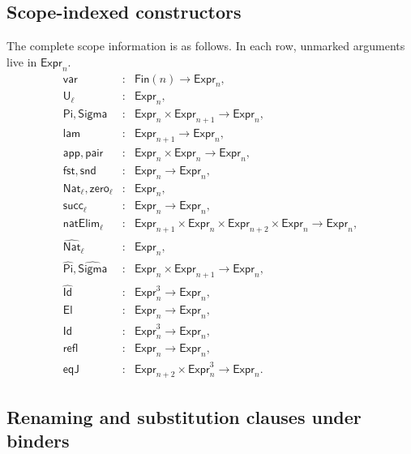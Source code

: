 \documentclass[10pt,reqno]{amsart}
\newcommand{\Fin}{\mathsf{Fin}}
\newcommand{\Expr}{\mathsf{Expr}}
\newcommand{\Var}{\mathsf{var}}
\newcommand{\Sort}{\mathsf{U}}
\newcommand{\PiTy}{\mathsf{Pi}}
\newcommand{\SigmaTy}{\mathsf{Sigma}}
\newcommand{\Lam}{\mathsf{lam}}
\newcommand{\App}{\mathsf{app}}
\newcommand{\Pair}{\mathsf{pair}}
\newcommand{\Fst}{\mathsf{fst}}
\newcommand{\Snd}{\mathsf{snd}}
\newcommand{\NatTy}{\mathsf{Nat}}
\newcommand{\Zero}{\mathsf{zero}}
\newcommand{\Succ}{\mathsf{succ}}
\newcommand{\NatElim}{\mathsf{natElim}}
\newcommand{\CodeNat}{\widehat{\mathsf{Nat}}}
\newcommand{\CodePi}{\widehat{\mathsf{Pi}}}
\newcommand{\CodeSigma}{\widehat{\mathsf{Sigma}}}
\newcommand{\CodeId}{\widehat{\mathsf{Id}}}
\newcommand{\El}{\mathsf{El}}
\newcommand{\IdTy}{\mathsf{Id}}
\newcommand{\Refl}{\mathsf{refl}}
\newcommand{\EqJ}{\mathsf{eqJ}}
\begin{document}
\subsection{Scope-indexed constructors}

The complete scope information is as follows.  In each row, unmarked
arguments live in \(\Expr_n\).
\[
\begin{array}{rcl}
\Var &:& \Fin(n)\to\Expr_n,\\
\Sort_\ell&:&\Expr_n,\\
\PiTy,\SigmaTy&:&\Expr_n\times\Expr_{n+1}\to\Expr_n,\\
\Lam&:&\Expr_{n+1}\to\Expr_n,\\
\App,\Pair&:&\Expr_n\times\Expr_n\to\Expr_n,\\
\Fst,\Snd&:&\Expr_n\to\Expr_n,\\
\NatTy_\ell,\Zero_\ell&:&\Expr_n,\\
\Succ_\ell&:&\Expr_n\to\Expr_n,\\
\NatElim_\ell&:&
  \Expr_{n+1}\times\Expr_n\times\Expr_{n+2}\times\Expr_n
  \to\Expr_n,\\
\CodeNat_\ell&:&\Expr_n,\\
\CodePi,\CodeSigma&:&\Expr_n\times\Expr_{n+1}\to\Expr_n,\\
\CodeId&:&\Expr_n^3\to\Expr_n,\\
\El&:&\Expr_n\to\Expr_n,\\
\IdTy&:&\Expr_n^3\to\Expr_n,\\
\Refl&:&\Expr_n\to\Expr_n,\\
\EqJ&:&\Expr_{n+2}\times\Expr_n^3\to\Expr_n.
\end{array}
\tag{A.1}\label{eq:full-grammar}
\]

\subsection{Renaming and substitution clauses under binders}
\end{document}
